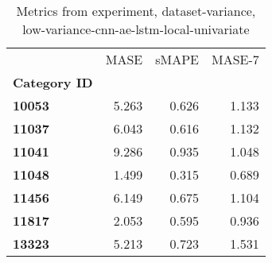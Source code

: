 \begin{table}[h]
\centering
\caption{Metrics from experiment, dataset-variance, low-variance-cnn-ae-lstm-local-univariate}
\label{table:low-variance-cnn-ae-lstm-local-univariate-dataset-variance}
\begin{tabular}{lrrr}
\toprule
{} &   MASE &  sMAPE &  MASE-7 \\
\textbf{Category ID} &        &        &         \\
\midrule
\textbf{10053      } &  5.263 &  0.626 &   1.133 \\
\textbf{11037      } &  6.043 &  0.616 &   1.132 \\
\textbf{11041      } &  9.286 &  0.935 &   1.048 \\
\textbf{11048      } &  1.499 &  0.315 &   0.689 \\
\textbf{11456      } &  6.149 &  0.675 &   1.104 \\
\textbf{11817      } &  2.053 &  0.595 &   0.936 \\
\textbf{13323      } &  5.213 &  0.723 &   1.531 \\
\bottomrule
\end{tabular}
\end{table}
